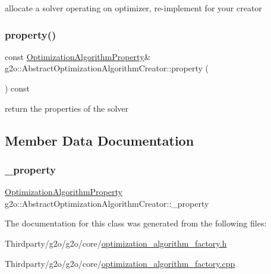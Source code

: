 allocate a solver operating on optimizer, re-\/implement for your creator 

\mbox{\label{classg2o_1_1_abstract_optimization_algorithm_creator_ab074710276ea3496d5bff118e48c6030}} 
\subsubsection{\texorpdfstring{property()}{property()}}
{\footnotesize\ttfamily const \mbox{\hyperlink{structg2o_1_1_optimization_algorithm_property}{Optimization\+Algorithm\+Property}}\& g2o\+::\+Abstract\+Optimization\+Algorithm\+Creator\+::property (\begin{DoxyParamCaption}{ }\end{DoxyParamCaption}) const\hspace{0.3cm}{\ttfamily [inline]}}



return the properties of the solver 



\subsection{Member Data Documentation}
\mbox{\label{classg2o_1_1_abstract_optimization_algorithm_creator_acf2663d0d6dec71049e4853a9825eafb}} 
\subsubsection{\texorpdfstring{\+\_\+property}{\_property}}
{\footnotesize\ttfamily \mbox{\hyperlink{structg2o_1_1_optimization_algorithm_property}{Optimization\+Algorithm\+Property}} g2o\+::\+Abstract\+Optimization\+Algorithm\+Creator\+::\+\_\+property\hspace{0.3cm}{\ttfamily [protected]}}



The documentation for this class was generated from the following files\+:\begin{DoxyCompactItemize}
\item 
Thirdparty/g2o/g2o/core/\mbox{\hyperlink{optimization__algorithm__factory_8h}{optimization\+\_\+algorithm\+\_\+factory.\+h}}\item 
Thirdparty/g2o/g2o/core/\mbox{\hyperlink{optimization__algorithm__factory_8cpp}{optimization\+\_\+algorithm\+\_\+factory.\+cpp}}\end{DoxyCompactItemize}
